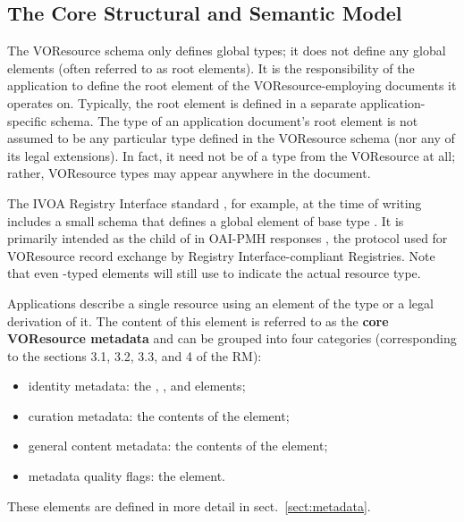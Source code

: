 \documentclass[11pt,a4paper]{ivoa}
\begin{document}
\subsection{The Core Structural and Semantic Model}
\label{sect:core}

The VOResource schema only defines global types; it does not define
any global elements (often referred to as root elements).  It is the
responsibility of the application to define the root element of the
VOResource-employing documents it operates on.  Typically, the root
element is defined in a separate application-specific schema.  The
type of an application document's root element is not assumed to be
any particular type defined in the VOResource schema (nor any of its
legal extensions).  In fact, it need not be of a type from the
VOResource at all; rather, VOResource types may appear anywhere in the
document.   

The IVOA Registry Interface standard \citep{2009ivoa.spec.1104B}, 
for example, at the time of writing includes a small schema that defines
a global element  of base type
.  It is primarily intended as the child of
 in OAI-PMH responses \citep{std:oaipmh}, the protocol
used for VOResource record exchange by Registry Interface-compliant
Registries.  Note that even
-typed elements will still use  to
indicate the actual resource type.

Applications describe a single resource using an element of the type
 or a legal derivation of it.  The content of this
element is referred to as the \textbf{core VOResource
metadata} and can be grouped into four categories (corresponding to the
sections 3.1, 3.2, 3.3, and 4 of the RM):

\begin{itemize}
  \item identity metadata:  the ,
       , and
        elements;
  \item curation metadata:  the contents of the
        element;
  \item general content metadata:  the contents of the
        element;
  \item metadata quality flags:  the
        element.
\end{itemize}


These elements are defined in more detail in sect.~\ref{sect:metadata}.
\end{document}
